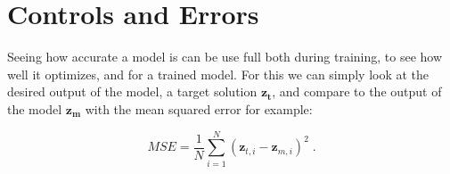 \section{Controls and Errors}

Seeing how accurate a model is can be use full both during training, to see how well it optimizes, and for a trained model. For this we can simply look at the desired output of the model, a target solution $\boldsymbol{z_t}$, and compare to the output of the model $\boldsymbol{z_m}$ with the mean squared error for example:

\begin{equation} \label{eq:mse}
    MSE = \frac{1}{N} \sum_{i = 1}^N (\boldsymbol{z}_{t, i} - \boldsymbol{z}_{m, i})^2 \; .
\end{equation}





